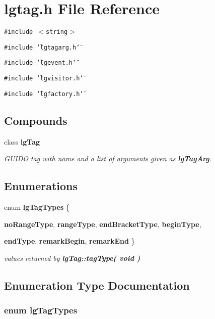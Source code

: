\section{lgtag.h File Reference}
\label{lgtag_8h}
{\tt \#include $<$string$>$}\par
{\tt \#include \char`\"{}lgtagarg.h\char`\"{}}\par
{\tt \#include \char`\"{}lgevent.h\char`\"{}}\par
{\tt \#include \char`\"{}lgvisitor.h\char`\"{}}\par
{\tt \#include \char`\"{}lgfactory.h\char`\"{}}\par
\subsection*{Compounds}
\begin{CompactItemize}
\item 
class {\bf lg\-Tag}
\begin{CompactList}\small\item\em GUIDO tag with name and a list of arguments given as {\bf lg\-Tag\-Arg}. \item\end{CompactList}\end{CompactItemize}
\subsection*{Enumerations}
\begin{CompactItemize}
\item 
enum {\bf lg\-Tag\-Types} \{ \par
{\bf no\-Range\-Type}, 
{\bf range\-Type}, 
{\bf end\-Bracket\-Type}, 
{\bf begin\-Type}, 
\par
{\bf end\-Type}, 
{\bf remark\-Begin}, 
{\bf remark\-End}
 \}
\begin{CompactList}\small\item\em values returned by {\bf lg\-Tag::tag\-Type( void )} \item\end{CompactList}\end{CompactItemize}


\subsection{Enumeration Type Documentation}
\subsubsection{\setlength{\rightskip}{0pt plus 5cm}enum {\bf lg\-Tag\-Types}}\label{lgtag_8h_a7}


